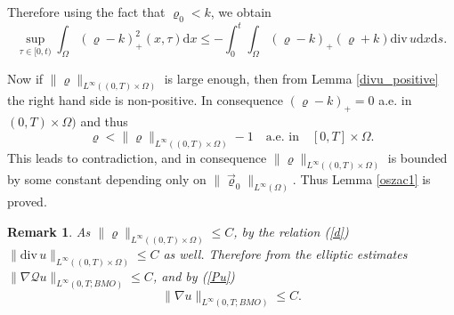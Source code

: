 \documentclass[11pt]{article}
\newcommand{\dd}{\mathrm{d}}
\newcommand{\ddiv}{\mathrm{div\,}}
\newcommand{\cQ}{\mathcal{Q}}
\newtheorem{rem}[tw]{Remark}
\numberwithin{equation}{section}
\numberwithin{tw}{section}
\begin{document}
Therefore using the fact that $\varrho_0<k$, we obtain
\[
\sup_{\tau \in [0,t)}\int_\Omega (\varrho-k)_+^2(x,\tau) \dd x \leq -\int_0^t\int_\Omega (\varrho-k)_+(\varrho+k)\ddiv u\dd x\dd s. \]

Now if $\|\varrho\|_{L^\infty((0,T)\times\Omega)}$ is large enough, then from Lemma \ref{divu_positive} the right hand side is non-positive.  
In consequence $(\varrho-k)_+=0$ a.e. in $(0,T)\times\Omega)$ and thus
\[ \varrho<\|\varrho\|_{L^\infty((0,T)\times\Omega)}-1 \quad \text{a.e. in} \quad [0,T]\times\Omega. \]
This leads to contradiction, and in consequence $\|\varrho\|_{L^\infty((0,T)\times\Omega)}$ is bounded by some constant depending only on $\|\vec\varrho_0\|_{L^\infty(\Omega)}$. Thus Lemma \ref{oszac1} is proved.

\smallskip 
\begin{rem}
As $\|\varrho\|_{L^\infty((0,T)\times\Omega)}\leq C$, by the relation (\ref{d}) $\|\ddiv u\|_{L^\infty((0,T)\times\Omega)}\leq C$ as well. Therefore from the elliptic estimates $\|\nabla\cQ u\|_{L^\infty(0,T;BMO)}\leq C$, and by (\ref{Pu})
\begin{equation}\label{bmo}  
 \|\nabla u\|_{L^\infty(0,T;BMO)}\leq C. 
 \end{equation}
 \end{rem}




\end{document}
